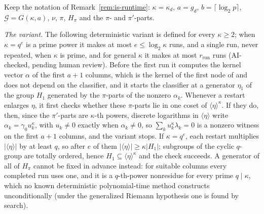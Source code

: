 \begin{remark}
\label{rem:sde-side-tape}
Keep the notation of Remark~\ref{rem:is-runtime}: $\kappa = \kappa_d$, $a = g_d$, $b = \lceil\log_2 p\rceil$, $\mathcal{G} = G(\kappa,a)$, $\nu$, $\pi$, $H_\pi$ and the $\pi$- and $\pi'$-parts.

\emph{The variant.} The following deterministic variant is defined for every $\kappa \ge 2$; when $\kappa = q^e$ is a prime power it makes at most $e \le \log_2\kappa$ runs, and a single run, never repeated, when $\kappa$ is prime, and for general $\kappa$ it makes at most $r_{\mathrm{run}}$ runs (AI-checked, pending human review). Before the first run it computes the kernel vector $\alpha$ of the first $a+1$ columns, which is the kernel of the first node of \cite[Lemma~12]{IvanyosSantha2015} and does not depend on the classifier, and it starts the classifier at a generator $\eta_1$ of the group $H_1$ generated by the $\pi$-parts of the nonzero $\alpha_k$. Whenever a restart enlarges $\eta$, it first checks whether these $\pi$-parts lie in one coset of $\langle\eta\rangle^{\kappa}$. If they do, then, since the $\pi'$-parts are $\kappa$-th powers, discrete logarithms in $\langle\eta\rangle$ write $\alpha_k = \gamma_0 u_k^{\kappa}$, with $u_k \ne 0$ exactly when $\alpha_k \ne 0$, so $\sum_k u_k^{\kappa}\lambda_k = 0$ is a nonzero witness on the first $a+1$ columns, and the variant stops. If $\kappa = q^e$, each restart multiplies $|\langle\eta\rangle|$ by at least $q$, so after $e$ of them $|\langle\eta\rangle| \ge \kappa|H_1|$; subgroups of the cyclic $q$-group are totally ordered, hence $H_1 \subseteq \langle\eta\rangle^{\kappa}$ and the check succeeds. A generator of all of $H_\pi$ cannot be fixed in advance instead: for suitable columns every completed run uses one, and it is a $q$-th-power nonresidue for every prime $q \mid \kappa$, which no known deterministic polynomial-time method constructs unconditionally (under the generalized Riemann hypothesis one is found by search).


\end{remark}
